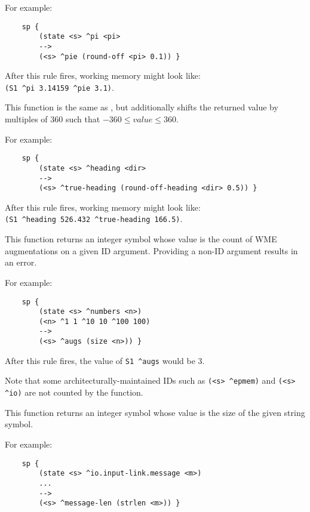 \begin{description}
	For example:

	\begin{verbatim}
	sp {
	    (state <s> ^pi <pi>
	    -->
	    (<s> ^pie (round-off <pi> 0.1)) }
	\end{verbatim}

	After this rule fires, working memory might look like: \\
	\verb|(S1 ^pi 3.14159 ^pie 3.1)|.


\item [\soarb{round-off-heading} --- ]
	This function is the same as , but additionally shifts the returned value by multiples of 360 such that $-360 \le value \le 360$.

	For example:

	\begin{verbatim}
	sp {
	    (state <s> ^heading <dir>
	    -->
	    (<s> ^true-heading (round-off-heading <dir> 0.5)) }
	\end{verbatim}

	After this rule fires, working memory might look like: \\
	\verb|(S1 ^heading 526.432 ^true-heading 166.5)|.


\item [\soarb{size} --- ]
	This function returns an integer symbol whose value is the count of WME augmentations on a given ID argument. Providing a non-ID argument results in an error.

	For example:

	\begin{verbatim}
	sp {
	    (state <s> ^numbers <n>)
	    (<n> ^1 1 ^10 10 ^100 100)
	    -->
	    (<s> ^augs (size <n>)) }
	\end{verbatim}

	After this rule fires, the value of \verb=S1 ^augs= would be $3$.

	Note that some architecturally-maintained IDs such as \verb=(<s> ^epmem)= and \verb=(<s> ^io)= are not counted by the  function.

\item [\soarb{strlen} --- ]
	This function returns an integer symbol whose value is the size of the given string symbol.

	For example:

	\begin{verbatim}
	sp {
	    (state <s> ^io.input-link.message <m>)
	    ...
	    -->
	    (<s> ^message-len (strlen <m>)) }
	\end{verbatim}



\end{description}
